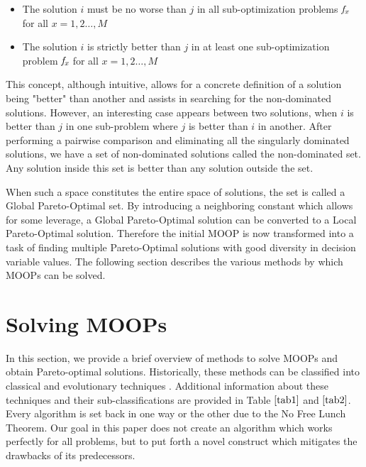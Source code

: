 \documentclass[conference]{IEEEtran}
\begin{document}
\begin{itemize}
\item The solution $\textit{i}$ must be no worse than $\textit{j}$ in all sub-optimization problems $\textit{f\textsubscript{x}}$ for all $\textit{x} = 1,2 \dots, \textit{M}$
\item The solution $\textit{i}$ is strictly better than $\textit{j}$ in at least one sub-optimization problem $\textit{f\textsubscript{x}}$ for all $\textit{x} = 1,2 \dots, \textit{M}$
\end{itemize}

This concept, although intuitive, allows for a concrete definition of a solution being "better" than another and assists in searching for the non-dominated solutions. However, an interesting case appears between two solutions, when $\textit{i}$ is better than $\textit{j}$ in one sub-problem where $\textit{j}$ is better than $\textit{i}$ in another. After performing a pairwise comparison and eliminating all the singularly dominated solutions, we have a set of non-dominated solutions called the non-dominated set. Any solution inside this set is better than any solution outside the set. 

When such a space constitutes the entire space of solutions, the set is called a Global Pareto-Optimal set. By introducing a neighboring constant which allows for some leverage, a Global Pareto-Optimal solution can be converted to a Local Pareto-Optimal solution. Therefore the initial MOOP is now transformed into a task of finding multiple Pareto-Optimal solutions with good diversity in decision variable values. The following section describes the various methods by which MOOPs can be solved. 


 
\section{Solving MOOPs}

In this section, we provide a brief overview of methods to solve MOOPs and obtain Pareto-optimal solutions. Historically, these methods can be classified into classical and evolutionary techniques \cite{vikhar} \cite{swarm}. Additional information about these techniques and their sub-classifications are provided in Table $\ref{tab1}$ and $\ref{tab2}$. Every algorithm is set back in one way or the other due to the No Free Lunch Theorem. Our goal in this paper does not create an algorithm which works perfectly for all problems, but to put forth a novel construct which mitigates the drawbacks of its predecessors. 
\end{document}
